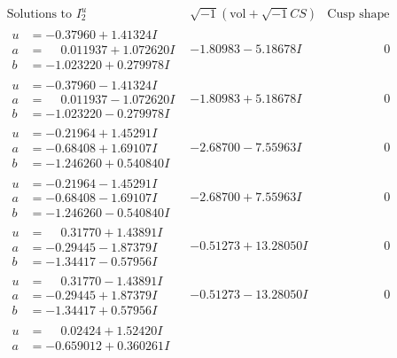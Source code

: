 \documentclass[1p]{elsarticle_modified}
\theoremstyle{definition}
\newcommand{\I}{\sqrt{-1}}
\begin{document}
$$\begin{array}{c|c|c}
\text{Solutions to }I^u_{2}& \I (\text{vol} + \sqrt{-1}CS) & \text{Cusp shape}\\
 \hline 
\begin{aligned}
u &= -0.37960 + 1.41324 I \\
a &= \phantom{-}0.011937 + 1.072620 I \\
b &= -1.023220 + 0.279978 I\end{aligned}
 & -1.80983 - 5.18678 I & \phantom{-0.000000 } 0 \\ \hline\begin{aligned}
u &= -0.37960 - 1.41324 I \\
a &= \phantom{-}0.011937 - 1.072620 I \\
b &= -1.023220 - 0.279978 I\end{aligned}
 & -1.80983 + 5.18678 I & \phantom{-0.000000 } 0 \\ \hline\begin{aligned}
u &= -0.21964 + 1.45291 I \\
a &= -0.68408 + 1.69107 I \\
b &= -1.246260 + 0.540840 I\end{aligned}
 & -2.68700 - 7.55963 I & \phantom{-0.000000 } 0 \\ \hline\begin{aligned}
u &= -0.21964 - 1.45291 I \\
a &= -0.68408 - 1.69107 I \\
b &= -1.246260 - 0.540840 I\end{aligned}
 & -2.68700 + 7.55963 I & \phantom{-0.000000 } 0 \\ \hline\begin{aligned}
u &= \phantom{-}0.31770 + 1.43891 I \\
a &= -0.29445 - 1.87379 I \\
b &= -1.34417 - 0.57956 I\end{aligned}
 & -0.51273 + 13.28050 I & \phantom{-0.000000 } 0 \\ \hline\begin{aligned}
u &= \phantom{-}0.31770 - 1.43891 I \\
a &= -0.29445 + 1.87379 I \\
b &= -1.34417 + 0.57956 I\end{aligned}
 & -0.51273 - 13.28050 I & \phantom{-0.000000 } 0 \\ \hline\begin{aligned}
u &= \phantom{-}0.02424 + 1.52420 I \\
a &= -0.659012 + 0.360261 I \\

\end{aligned}
\end{array}$$
\end{document}
